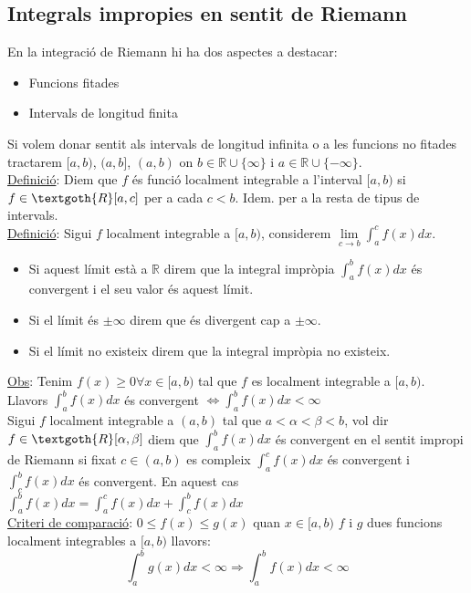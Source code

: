 \subsection{Integrals impropies en sentit de Riemann}
En la integració de Riemann hi ha dos aspectes a destacar:
\begin{itemize}
    \item Funcions fitades
    \item Intervals de longitud finita
\end{itemize}
Si volem donar sentit als intervals de longitud infinita o a les funcions no fitades tractarem $[a, b)$, $(a, b]$, $(a, b)$ on $b \in \mathbb{R}\cup \{\infty\}$ i $a \in \mathbb{R}\cup \{-\infty\}$.\\
\underline{Definició}: Diem que $f$ és funció localment integrable a l'interval $[a, b)$ si $f\in \textgoth{R}[a, c]$ per a cada $c < b$. Idem. per a la resta de tipus de intervals.\\
\underline{Definició}: Sigui $f$ localment integrable a $[a, b)$, considerem $\lim\limits_{c\rightarrow b} \int_a^cf(x)dx$.
\begin{itemize}
    \item Si aquest límit està a $\mathbb{R}$ direm que la integral impròpia $\int_a^bf(x)dx$ és convergent i el seu valor és aquest límit.
    \item Si el límit és $\pm \infty$ direm que és divergent cap a $\pm \infty$.
    \item Si el límit no existeix direm que la integral impròpia no existeix.
\end{itemize}
\underline{Obs}: Tenim $f(x) \geq 0 \forall x \in [a, b)$  tal que $f$ es localment integrable a $[a, b)$. Llavors $\int_a^b f(x) dx$ és convergent $\Leftrightarrow \int_a^b f(x) dx < \infty$\\
Sigui $f$ localment integrable a $(a, b)$ tal que $a < \alpha < \beta < b$, vol dir $f \in \textgoth{R}[\alpha, \beta]$ diem que $\int_a^b f(x)dx$ és convergent en el sentit impropi de Riemann si fixat $c \in (a, b)$ es compleix $\int_a^c f(x)dx$ és convergent i $\int_c^b f(x)dx$ és convergent. En aquest cas $\int_a^b f(x)dx = \int_a^c f(x)dx + \int_c^b f(x)dx$\\
\underline{Criteri de comparació}: $0 \leq f(x) \leq g(x)$ quan $x \in [a, b)$ $f$ i $g$ dues funcions localment integrables a $[a, b)$ llavors:
\begin{displaymath}
    \int_a^b g(x)dx < \infty \Rightarrow \int_a^b f(x) dx < \infty
\end{displaymath}
